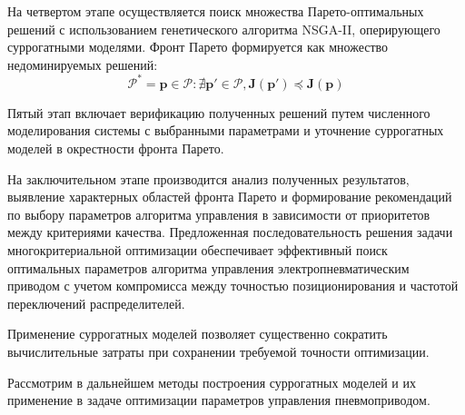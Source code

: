 На четвертом этапе осуществляется поиск множества Парето-оптимальных
решений с использованием генетического алгоритма NSGA-II, оперирующего
суррогатными моделями. Фронт Парето формируется как множество недоминируемых решений:
\begin{equation}
\mathcal{P}^* = {\mathbf{p} \in \mathcal{P}: \nexists \mathbf{p}' \in \mathcal{P}, \mathbf{J}(\mathbf{p}') \preceq \mathbf{J}(\mathbf{p})}
\end{equation}

Пятый этап включает верификацию полученных решений путем численного моделирования
системы с выбранными параметрами и уточнение суррогатных моделей в окрестности фронта Парето.

На заключительном этапе производится анализ полученных результатов,
выявление характерных областей фронта Парето и формирование
рекомендаций по выбору параметров алгоритма управления в зависимости от приоритетов между критериями качества.
Предложенная последовательность решения задачи многокритериальной оптимизации
обеспечивает эффективный поиск оптимальных параметров алгоритма
управления электропневматическим приводом с учетом компромисса
между точностью позиционирования и частотой переключений распределителей.

Применение суррогатных моделей позволяет существенно сократить вычислительные затраты при сохранении требуемой точности оптимизации.

Рассмотрим в дальнейшем методы построения суррогатных моделей
и их применение в задаче оптимизации параметров управления пневмоприводом.